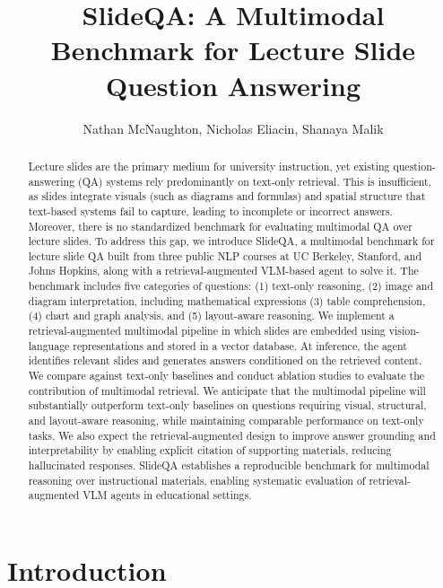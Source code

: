 \documentclass{article} %
\title{SlideQA: A Multimodal Benchmark for Lecture Slide Question Answering}
\author{Nathan McNaughton, Nicholas Eliacin, Shanaya Malik}
\begin{document}
\maketitle

\begin{abstract}
Lecture slides are the primary medium for university instruction, yet existing question-answering (QA) systems rely predominantly on text-only retrieval. This is insufficient, as slides integrate visuals (such as diagrams and formulas) and spatial structure that text-based systems fail to capture, leading to incomplete or incorrect answers. Moreover, there is no standardized benchmark for evaluating multimodal QA over lecture slides. To address this gap, we introduce SlideQA, a multimodal benchmark for lecture slide QA built from three public NLP courses at UC Berkeley, Stanford, and Johns Hopkins, along with a retrieval-augmented VLM-based agent to solve it. The benchmark includes five categories of questions: (1) text-only reasoning, (2) image and diagram interpretation, including mathematical expressions (3) table comprehension, (4) chart and graph analysis, and (5) layout-aware reasoning. We implement a retrieval-augmented multimodal pipeline in which slides are embedded using vision-language representations and stored in a vector database. At inference, the agent identifies relevant slides and generates answers conditioned on the retrieved content. We compare against text-only baselines and conduct ablation studies to evaluate the contribution of multimodal retrieval. We anticipate that the multimodal pipeline will substantially outperform text-only baselines on questions requiring visual, structural, and layout-aware reasoning, while maintaining comparable performance on text-only tasks.  We also expect the retrieval-augmented design to improve answer grounding and interpretability by enabling explicit citation of supporting materials, reducing hallucinated responses. SlideQA establishes a reproducible benchmark for multimodal reasoning over instructional materials, enabling systematic evaluation of retrieval-augmented VLM agents in educational settings.  
\end{abstract}

\section{Introduction}
\end{document}
